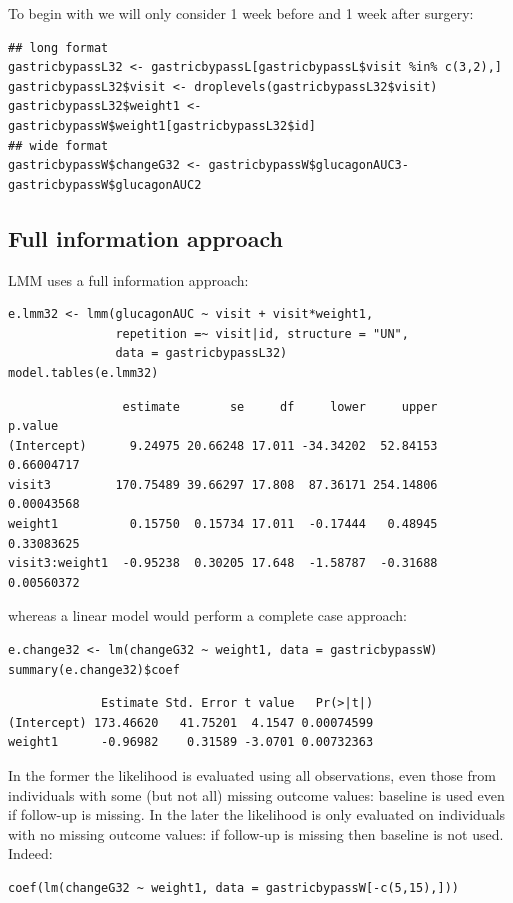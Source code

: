 \documentclass[12pt]{article}
\begin{document}
To begin with we will only consider 1 week before and 1 week after
surgery:
\lstset{language=r,label= ,caption= ,captionpos=b,numbers=none}
\begin{lstlisting}
## long format
gastricbypassL32 <- gastricbypassL[gastricbypassL$visit %in% c(3,2),]
gastricbypassL32$visit <- droplevels(gastricbypassL32$visit)
gastricbypassL32$weight1 <- gastricbypassW$weight1[gastricbypassL32$id]
## wide format
gastricbypassW$changeG32 <- gastricbypassW$glucagonAUC3-gastricbypassW$glucagonAUC2
\end{lstlisting}

\clearpage

\subsection{Full information approach}
\label{sec:org9268723}

LMM uses a full information approach:
\lstset{language=r,label= ,caption= ,captionpos=b,numbers=none}
\begin{lstlisting}
e.lmm32 <- lmm(glucagonAUC ~ visit + visit*weight1,
               repetition =~ visit|id, structure = "UN",
               data = gastricbypassL32)
model.tables(e.lmm32)
\end{lstlisting}

\begin{verbatim}
                estimate       se     df     lower     upper    p.value
(Intercept)      9.24975 20.66248 17.011 -34.34202  52.84153 0.66004717
visit3         170.75489 39.66297 17.808  87.36171 254.14806 0.00043568
weight1          0.15750  0.15734 17.011  -0.17444   0.48945 0.33083625
visit3:weight1  -0.95238  0.30205 17.648  -1.58787  -0.31688 0.00560372
\end{verbatim}


whereas a linear model would perform a complete case approach:
\lstset{language=r,label= ,caption= ,captionpos=b,numbers=none}
\begin{lstlisting}
e.change32 <- lm(changeG32 ~ weight1, data = gastricbypassW)
summary(e.change32)$coef
\end{lstlisting}

\begin{verbatim}
             Estimate Std. Error t value   Pr(>|t|)
(Intercept) 173.46620   41.75201  4.1547 0.00074599
weight1      -0.96982    0.31589 -3.0701 0.00732363
\end{verbatim}


In the former the likelihood is evaluated using all observations, even
those from individuals with some (but not all) missing outcome values:
baseline is used even if follow-up is missing. In the later the
likelihood is only evaluated on individuals with no missing outcome
values: if follow-up is missing then baseline is not used. Indeed:
\lstset{language=r,label= ,caption= ,captionpos=b,numbers=none}
\begin{lstlisting}
coef(lm(changeG32 ~ weight1, data = gastricbypassW[-c(5,15),]))
\end{lstlisting}
\end{document}
